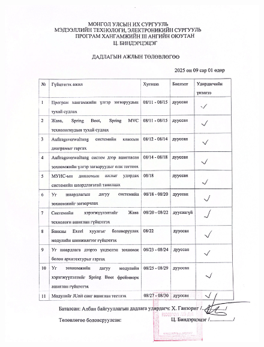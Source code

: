 \begin{figure}
	\centering
	\includegraphics[width=17cm]{images/plan.png}
	\label{fig:plan}
\end{figure}
